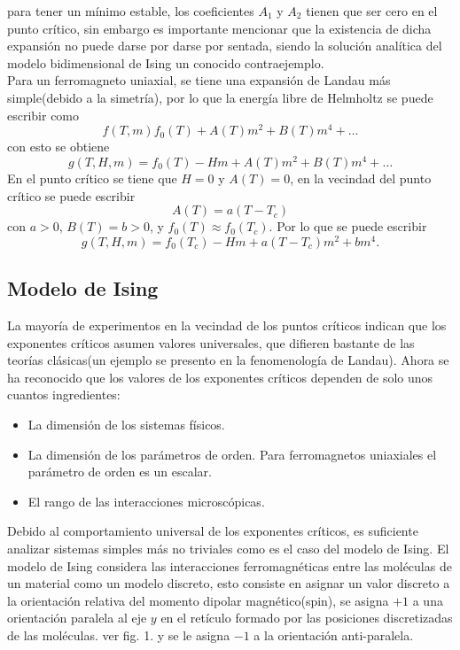\documentclass[a4paper]{article}
\begin{document}
para tener un mínimo estable, los coeficientes $A_1$ y $A_2$ tienen que ser cero en el punto crítico, sin embargo es importante mencionar que la existencia de dicha expansión no puede darse por darse por sentada, siendo la solución analítica del modelo bidimensional de Ising un conocido contraejemplo.\\
Para un ferromagneto uniaxial, se tiene una expansión de Landau más simple(debido a la simetría), por lo que la energía libre de Helmholtz se puede escribir como
\begin{equation}
f(T,m)f_0(T)+A(T)m^2+B(T)m^4+\hdots
\end{equation}
con esto se obtiene
\begin{equation}
g(T,H,m)=f_0(T)-H m+A(T)m^2+B(T)m^4+\hdots
\end{equation}
En el punto crítico se tiene que $H=0$ y $A(T)=0$, en la vecindad del punto crítico se puede escribir
\begin{equation}
A(T)=a(T-T_c)
\end{equation}
con $a>0$, $B(T)=b>0$, y $f_0(T)\approx f_0 (T_c)$. Por lo que se puede escribir
\begin{equation}
g(T,H,m)=f_0(T_c)-H m+a(T-T_c)m^2+b m^4.
\end{equation}

\subsection{Modelo de Ising}
La mayoría de experimentos en la vecindad de los puntos críticos indican que los exponentes críticos asumen valores universales, que difieren bastante de las teorías clásicas(un ejemplo se presento en la fenomenología de Landau). Ahora se ha reconocido que los valores de los exponentes críticos dependen de solo unos cuantos ingredientes:
\begin{itemize}
\item La dimensión de los sistemas físicos.
\item La dimensión de los parámetros de orden. Para ferromagnetos uniaxiales el parámetro de orden es un escalar.
\item El rango de las interacciones microscópicas.
\end{itemize}
Debido al comportamiento universal de los exponentes críticos, es suficiente analizar sistemas simples más no triviales como es el caso del modelo de Ising. El modelo de Ising considera las interacciones ferromagnéticas entre las moléculas de un material como un modelo discreto, esto consiste en asignar un valor discreto a la orientación relativa del momento dipolar magnético(spin), se asigna $+1$ a una orientación paralela al eje $y$ en el retículo formado por las posiciones discretizadas de las moléculas. ver fig. 1. y se le asigna $-1$ a la orientación anti-paralela. 
\end{document}
